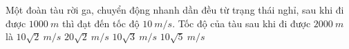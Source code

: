 \begin{vidu}%
Một đoàn tàu rời ga, chuyển động nhanh dần đều từ trạng thái nghỉ, sau khi đi được $1000\ m$ thì đạt đến tốc độ $10\ m/s$. Tốc độ của tàu sau khi đi được $2000\ m$ là
\choice
{\True $10\sqrt{2}\ m/s$}
{$20\sqrt{2}\ m/s$}
{$10\sqrt{3}\ m/s$}
{$10\sqrt{5}\ m/s$}
\end{vidu}


